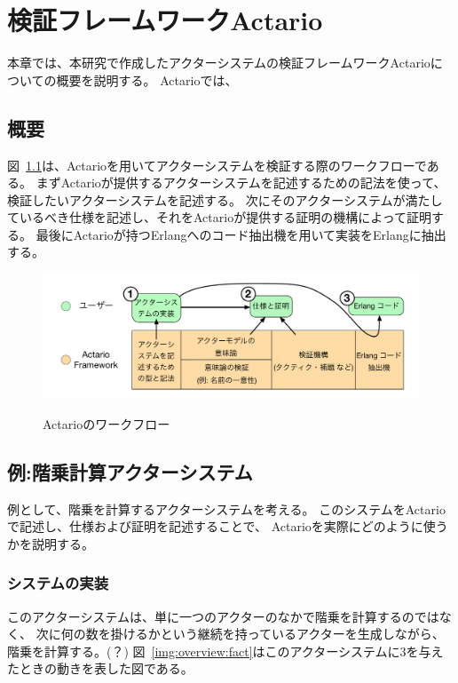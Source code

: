 \chapter{検証フレームワークActario}
\label{chapter:overview}

本章では、本研究で作成したアクターシステムの検証フレームワークActarioについての概要を説明する。
Actarioでは、

\section{概要}

図~\ref{img:overview:workflow}は、Actarioを用いてアクターシステムを検証する際のワークフローである。
まずActarioが提供するアクターシステムを記述するための記法を使って、検証したいアクターシステムを記述する。
次にそのアクターシステムが満たしているべき仕様を記述し、それをActarioが提供する証明の機構によって証明する。
最後にActarioが持つErlangへのコード抽出機を用いて実装をErlangに抽出する。

\begin{figure}[tp]
  \includegraphics[width=14cm]{./img/overview/workflow.pdf}
  \label{img:overview:workflow}
  \caption{Actarioのワークフロー}
\end{figure}

\section{例:階乗計算アクターシステム}

例として、階乗を計算するアクターシステムを考える。
このシステムをActarioで記述し、仕様および証明を記述することで、
Actarioを実際にどのように使うかを説明する。

\subsection{システムの実装}

このアクターシステムは、単に一つのアクターのなかで階乗を計算するのではなく、
次に何の数を掛けるかという継続を持っているアクターを生成しながら、
階乗を計算する。(？)
図~\ref{img:overview:fact}はこのアクターシステムに$3$を与えたときの動きを表した図である。

